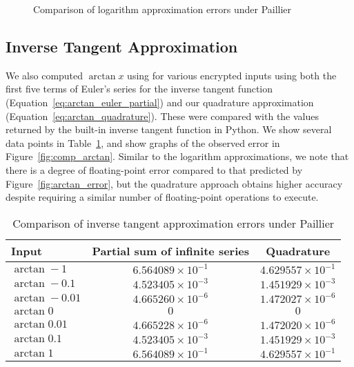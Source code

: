 \begin{figure}[!ht]
	\centering
	\caption{Comparison of logarithm approximation errors under Paillier}
	\label{fig:comp_log}
\end{figure}

\subsection{Inverse Tangent Approximation}
We also computed $\arctan x$ using for various encrypted inputs using both the first five terms of Euler's series for the inverse tangent function (Equation~\ref{eq:arctan_euler_partial}) and our quadrature approximation (Equation~\ref{eq:arctan_quadrature}). These were compared with the values returned by the built-in inverse tangent function in Python. We show several data points in Table~\ref{tab:arctan_approximation}, and show graphs of the observed error in Figure~\ref{fig:comp_arctan}. Similar to the logarithm approximations, we note that there is a degree of floating-point error compared to that predicted by Figure~\ref{fig:arctan_error}, but the quadrature approach obtains higher accuracy despite requiring a similar number of floating-point operations to execute.

\begin{table}[ht]
	\caption{Comparison of inverse tangent approximation errors under Paillier}
	\label{tab:arctan_approximation}
	\begin{tabular}{lcc}
		\toprule
		Input & Partial sum of infinite series & Quadrature\\
		\midrule
		$\arctan -1$ & $6.564089 \times 10^{-1}$ & $4.629557 \times 10^{-1}$\\
		$\arctan -0.1$ & $4.523405 \times 10^{-3}$ & $1.451929 \times 10^{-3}$\\
		$\arctan -0.01$ & $4.665260 \times 10^{-6}$ & $1.472027 \times 10^{-6}$\\
		$\arctan 0$ & $0$ & $0$\\
		$\arctan 0.01$ & $4.665228 \times 10^{-6}$ & $1.472020 \times 10^{-6}$\\
		$\arctan 0.1$ & $4.523405 \times 10^{-3} $ & $1.451929 \times 10^{-3}$\\
		$\arctan 1$ & $6.564089 \times 10^{-1} $ & $4.629557 \times 10^{-1}$\\
	\bottomrule
\end{tabular}
\end{table}

